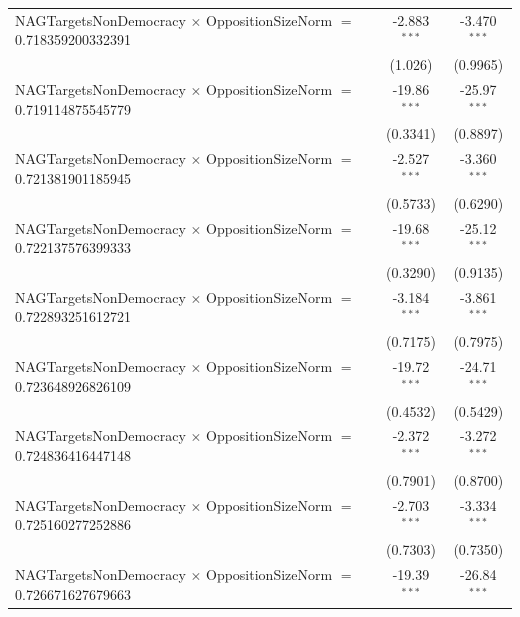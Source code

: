 \begin{tabular}{lcc}
   NAGTargetsNonDemocracy $\times$ OppositionSizeNorm $=$ 0.718359200332391     & -2.883$^{***}$       & -3.470$^{***}$\\   
                                                                                & (1.026)              & (0.9965)\\   
   NAGTargetsNonDemocracy $\times$ OppositionSizeNorm $=$ 0.719114875545779     & -19.86$^{***}$       & -25.97$^{***}$\\   
                                                                                & (0.3341)             & (0.8897)\\   
   NAGTargetsNonDemocracy $\times$ OppositionSizeNorm $=$ 0.721381901185945     & -2.527$^{***}$       & -3.360$^{***}$\\   
                                                                                & (0.5733)             & (0.6290)\\   
   NAGTargetsNonDemocracy $\times$ OppositionSizeNorm $=$ 0.722137576399333     & -19.68$^{***}$       & -25.12$^{***}$\\   
                                                                                & (0.3290)             & (0.9135)\\   
   NAGTargetsNonDemocracy $\times$ OppositionSizeNorm $=$ 0.722893251612721     & -3.184$^{***}$       & -3.861$^{***}$\\   
                                                                                & (0.7175)             & (0.7975)\\   
   NAGTargetsNonDemocracy $\times$ OppositionSizeNorm $=$ 0.723648926826109     & -19.72$^{***}$       & -24.71$^{***}$\\   
                                                                                & (0.4532)             & (0.5429)\\   
   NAGTargetsNonDemocracy $\times$ OppositionSizeNorm $=$ 0.724836416447148     & -2.372$^{***}$       & -3.272$^{***}$\\   
                                                                                & (0.7901)             & (0.8700)\\   
   NAGTargetsNonDemocracy $\times$ OppositionSizeNorm $=$ 0.725160277252886     & -2.703$^{***}$       & -3.334$^{***}$\\   
                                                                                & (0.7303)             & (0.7350)\\   
   NAGTargetsNonDemocracy $\times$ OppositionSizeNorm $=$ 0.726671627679663     & -19.39$^{***}$       & -26.84$^{***}$\\   

\end{tabular}

